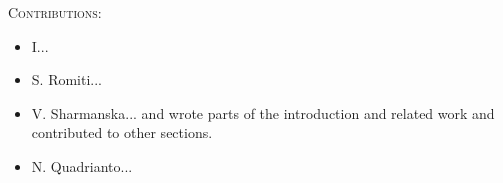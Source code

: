 \noindent\textsc{Contributions:}
\begin{itemize}
  \item I...
  \item S. Romiti...
  \item V. Sharmanska...
    and wrote parts of the introduction and related work and contributed to other sections.
  \item N. Quadrianto... 
\end{itemize}
